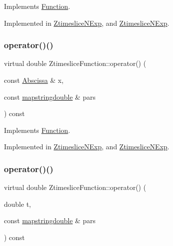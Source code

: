 Implements \mbox{\hyperlink{classFunction_a8cd7f815d5f883cc523341c53ba811d0}{Function}}.



Implemented in \mbox{\hyperlink{classZtimesliceNExp_af9ac01b3a80221dd8bf1a0a11cbdbb66}{Ztimeslice\+N\+Exp}}, and \mbox{\hyperlink{classZtimesliceNExp_af9ac01b3a80221dd8bf1a0a11cbdbb66}{Ztimeslice\+N\+Exp}}.

\mbox{\label{classZtimesliceFunction_ae7851ae590054311c69cdafc8f7ed621}} 
\subsubsection{\texorpdfstring{operator()()}{operator()()}\hspace{0.1cm}{\footnotesize\ttfamily [2/4]}}
{\footnotesize\ttfamily virtual double Ztimeslice\+Function\+::operator() (\begin{DoxyParamCaption}\item[{const \mbox{\hyperlink{classAbscissa}{Abscissa}} \&}]{x,  }\item[{const \mbox{\hyperlink{lib_2fitting__lib_2includes_8h_a647b481c557c7966517f753340a81d13}{mapstringdouble}} \&}]{pars }\end{DoxyParamCaption}) const\hspace{0.3cm}{\ttfamily [pure virtual]}}



Implements \mbox{\hyperlink{classFunction_a8cd7f815d5f883cc523341c53ba811d0}{Function}}.



Implemented in \mbox{\hyperlink{classZtimesliceNExp_af9ac01b3a80221dd8bf1a0a11cbdbb66}{Ztimeslice\+N\+Exp}}, and \mbox{\hyperlink{classZtimesliceNExp_af9ac01b3a80221dd8bf1a0a11cbdbb66}{Ztimeslice\+N\+Exp}}.

\mbox{\label{classZtimesliceFunction_aee3aaf0215deb7e33e609a3d227c28d5}} 
\subsubsection{\texorpdfstring{operator()()}{operator()()}\hspace{0.1cm}{\footnotesize\ttfamily [3/4]}}
{\footnotesize\ttfamily virtual double Ztimeslice\+Function\+::operator() (\begin{DoxyParamCaption}\item[{double}]{t,  }\item[{const \mbox{\hyperlink{lib_2fitting__lib_2includes_8h_a647b481c557c7966517f753340a81d13}{mapstringdouble}} \&}]{pars }\end{DoxyParamCaption}) const\hspace{0.3cm}{\ttfamily [pure virtual]}}



